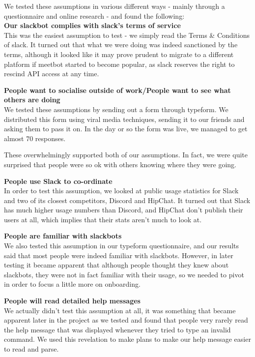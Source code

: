 \documentclass{report}
\begin{document}
We tested these assumptions in various different ways - mainly through a questionnaire and online research - and found the following:\\

\textbf{Our slackbot complies with slack's terms of service}\\
This was the easiest assumption to test - we simply read the Terms \& Conditions of slack. It turned out that what we were doing was indeed sanctioned by the terms, although it looked like it may prove prudent to migrate to a different platform if meetbot started to become popular, as slack reserves the right to rescind API access at any time.

\textbf{People want to socialise outside of work/People want to see what others are doing}\\
We tested these assumptions by sending out a form through typeform. We distributed this form using viral media techniques, sending it to our friends and asking them to pass it on. In the day or so the form was live, we managed to get almost 70 responses.

These overwhelmingly supported both of our assumptions. In fact, we were quite surprised that people were so ok with others knowing where they were going.

\textbf{People use Slack to co-ordinate}\\
In order to test this assumption, we looked at public usage statistics for Slack and two of its closest competitors, Discord and HipChat. It turned out that Slack has much higher usage numbers than Discord, and HipChat don't publish their users at all, which implies that their stats aren't much to look at.

\textbf{People are familiar with slackbots}\\
We also tested this assumption in our typeform questionnaire, and our results said that most people were indeed familiar with slackbots. However, in later testing it became apparent that although people thought they knew about slackbots, they were not in fact familiar with their usage, so we needed to pivot in order to focus a little more on onboarding.

\textbf{People will read detailed help messages}\\
We actually didn't test this assumption at all, it was something that became apparent later in the project as we tested and found that people very rarely read the help message that was displayed whenever they tried to type an invalid command. We used this revelation to make plans to make our help message easier to read and parse.
\end{document}
